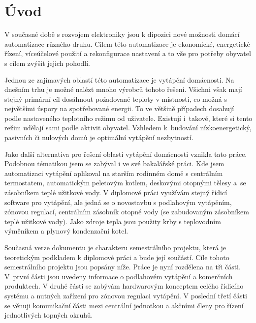 \chapter{Úvod}

V současné době s rozvojem elektroniky jsou k dipozici nové možnosti domácí automatizace různého druhu. Cílem této automatizace je ekonomické, energetické řízení, víceúčelové použití a rekonfigurace nastavení a to vše pro potřeby obyvatel s cílem zvýšit jejich pohodlí.


Jednou ze zajímavých oblastí této automatizace je vytápění domácnosti. Na dnešním trhu je možné nalézt mnoho výrobců tohoto řešení. Všichni však mají stejný primární cíl dosáhnout požadované teploty v místnosti, co možná s největšími úspory na spotřebované energii. To ve většině případech dosahují podle nastaveného teplotního režimu od uživatele. Existují i~takové, které si tento režim udělají sami podle aktivit obyvatel. Vzhledem k~budování nízkoenergetický, pasivních či nulových domů je optimální vytápění nezbytností.

Jako další alternativa pro řešení oblasti vytápění domácnosti vznikla tato práce. Podobnou tématikou jsem se zabýval i ve své bakalářské práci. Kde jsem automatizaci vytápění aplikoval na starším rodinném domě s centrálním termostatem, automatickým peletovým kotlem, deskovými otopnými tělesy a~se zásobníkem teplé užitkové vody. V diplomové práci využívám stejný řídicí software pro vytápění, ale jedná se o novostavbu s podlahovým vytápěním, zónovou regulací, centrálním zásobník otopné vody (se zabudovaným zásobníkem teplé užitkové vody). Jako zdroje tepla jsou použity krby s teplovodním výměníkem a plynový kondenzační kotel.

Současná verze dokumentu je charakteru semestrálního projektu, která je teoretickým podkladem k diplomové práci a bude její součástí. Cíle tohoto semestrálního projektu jsou popsány níže. Práce je nyní rozdělena na tři části. V~první části jsou uvedeny informace o podlahovém vytápění a komerčních produktech. V druhé části se zabývám hardwarovým konceptem celého řídicího systému a nutných zařízení pro zónovou regulaci vytápění. V poslední třetí části se věnuji komunikační části mezi centrální jednotkou a akčními členy pro řízení jednotlivých topných okruhů.

